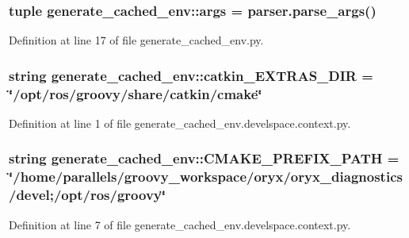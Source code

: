 \subsubsection[{args}]{\setlength{\rightskip}{0pt plus 5cm}tuple {\bf generate\-\_\-cached\-\_\-env\-::args} = parser.\-parse\-\_\-args()}\label{namespacegenerate__cached__env_a75c6158373e6fcee899e1337b8c59ad5}


\-Definition at line 17 of file generate\-\_\-cached\-\_\-env.\-py.

\subsubsection[{catkin\-\_\-\-E\-X\-T\-R\-A\-S\-\_\-\-D\-I\-R}]{\setlength{\rightskip}{0pt plus 5cm}string {\bf generate\-\_\-cached\-\_\-env\-::catkin\-\_\-\-E\-X\-T\-R\-A\-S\-\_\-\-D\-I\-R} = \char`\"{}/opt/ros/groovy/share/catkin/cmake\char`\"{}}\label{namespacegenerate__cached__env_a9c24e1b675ff632367a8b8f71cdccf13}


\-Definition at line 1 of file generate\-\_\-cached\-\_\-env.\-develspace.\-context.\-py.

\subsubsection[{\-C\-M\-A\-K\-E\-\_\-\-P\-R\-E\-F\-I\-X\-\_\-\-P\-A\-T\-H}]{\setlength{\rightskip}{0pt plus 5cm}string {\bf generate\-\_\-cached\-\_\-env\-::\-C\-M\-A\-K\-E\-\_\-\-P\-R\-E\-F\-I\-X\-\_\-\-P\-A\-T\-H} = \char`\"{}/home/parallels/groovy\-\_\-workspace/oryx/oryx\-\_\-diagnostics/devel;/opt/ros/groovy\char`\"{}}\label{namespacegenerate__cached__env_a5febf1390e491671a2bd270eb18aaec9}


\-Definition at line 7 of file generate\-\_\-cached\-\_\-env.\-develspace.\-context.\-py.

